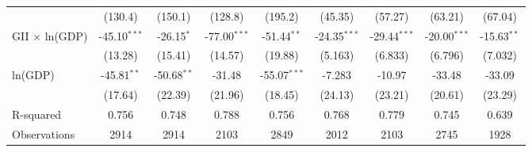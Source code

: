 \documentclass[10pt,letterpaper,subeqn]{beamer}
\begin{document}
\begin{frame}
\begin{table}[htbp]
{\begin{tabular}{l*{8}{c}}
            &     (130.4)         &     (150.1)         &     (128.8)         &     (195.2)         &     (45.35)         &     (57.27)         &     (63.21)         &     (67.04)         \\
GII $\times$ ln(GDP)&      -45.10$^{***}$&      -26.15$^{*}$  &      -77.00$^{***}$&      -51.44$^{**}$ &      -24.35$^{***}$&      -29.44$^{***}$&      -20.00$^{***}$&      -15.63$^{**}$ \\
            &     (13.28)         &     (15.41)         &     (14.57)         &     (19.88)         &     (5.163)         &     (6.833)         &     (6.796)         &     (7.032)         \\
ln(GDP)             &      -45.81$^{**}$ &      -50.68$^{**}$ &      -31.48         &      -55.07$^{***}$&      -7.283         &      -10.97         &      -33.48         &      -33.09         \\
            &     (17.64)         &     (22.39)         &     (21.96)         &     (18.45)         &     (24.13)         &     (23.21)         &     (20.61)         &     (23.29)         \\
\midrule
R-squared           &       0.756         &       0.748         &       0.788         &       0.756         &       0.768         &       0.779         &       0.745         &       0.639         \\
Observations        &        2914         &        2914         &        2103         &        2849         &        2012         &        2103         &        2745         &        1928         \\
\bottomrule\end{tabular}}\end{table}
\end{frame}
\end{document}
